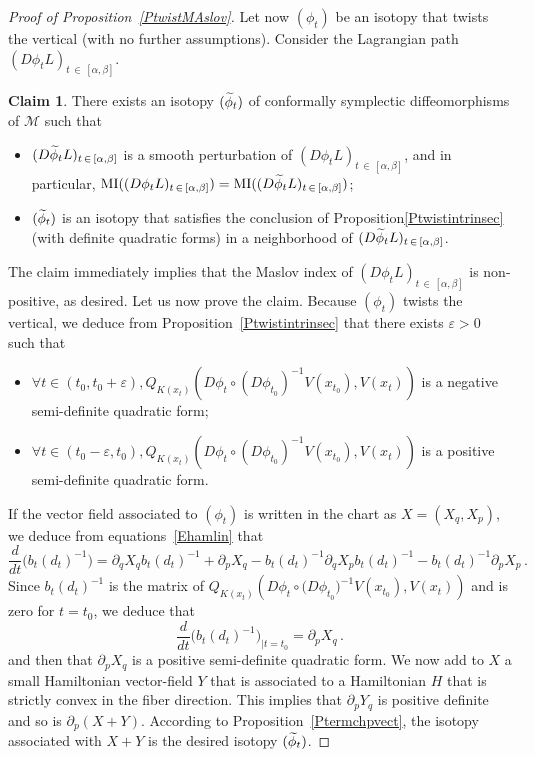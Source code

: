 \documentclass[10pt,a4paper]{amsart}
\numberwithin{equation}{section}
\newcommand*\M{\mathcal{M}}
\newcommand{\MI}{\mathrm{MI}}
\let\oldtilde\tilde
\renewcommand*{\tilde}[1]{\mathchoice{\widetilde{#1}}{\widetilde{#1}}{\oldtilde{#1}}{\oldtilde{#1}}}
\let\oldforall\forall
\renewcommand*{\forall}{\mathrel{\oldforall}}
\theoremstyle{definition}
\newtheorem{claim}[theo]{Claim}
\theoremstyle{remark}
\newenvironment{enonce}[1]{\begin{claim}}{\end{claim}}
\begin{document}
\begin{proof}[Proof of Proposition~\ref{PtwistMAslov}]
Let now $(\phi_t)$ be an isotopy that twists the vertical (with no further assumptions). Consider the Lagrangian path $(D\phi_tL)_{t\,\in\,[\alpha,\beta]}$.

\begin{enonce}{Claim}
There exists an isotopy $(\tilde\phi_t)$ of conformally symplectic diffeomorphisms of $\M$ such that
\begin{itemize}
\item $(D\tilde\phi_tL)_{t\,\in\,[\alpha,\beta]}$ is a smooth perturbation of $(D\phi_tL)_{t\,\in\,[\alpha,\beta]}$, and in particular, $\MI((D\phi_tL)_{t\,\in\,[\alpha,\beta]})=\MI((D\tilde\phi_tL)_{t\,\in\,[\alpha,\beta]})$;
\item $(\tilde\phi_t)$ is an isotopy {that satisfies the conclusion of Proposition\ref{Ptwistintrinsec} (with definite quadratic forms) in a neighborhood of $(D\tilde\phi_tL)_{t\,\in\,[\alpha,\beta]}$.}
\end{itemize}
\end{enonce}

The claim immediately implies that the Maslov index of $(D\phi_tL)_{t\,\in\,[\alpha,\beta]}$ is non-positive, as desired.\newline
Let us now prove the claim. Because $(\phi_t)$ twists the vertical, we deduce from Proposition~\ref{Ptwistintrinsec} that there exists $\varepsilon>0$ such that
\begin{itemize}
\item $\forall t\in (t_0, t_0+\varepsilon), Q_{K(x_t)}(D\phi_t\circ (D\phi_{t_0})^{-1}V(x_{t_0}), V(x_t)) $ is a negative semi-definite quadratic form;
\item $\forall t\in (t_0-\varepsilon, t_0), Q_{K(x_t)}(D\phi_t\circ (D\phi_{t_0})^{-1}V(x_{t_0}), V(x_t)) $ is a positive semi-definite quadratic form.
\end{itemize}
If the vector field associated to $(\phi_t)$ is written in the chart as $X=(X_q, X_p)$, we deduce from equations~\eqref{Ehamlin} that
\[
\frac{d}{dt}\big(b_t(d_t)^{-1}
\big)=\partial_qX_qb_t(d_t)^{-1}+\partial_pX_q-b_t(d_t)^{-1}\partial_qX_pb_t(d_t)^{-1}-b_t(d_t)^{-1}\partial_pX_p\,.
\]
Since $b_t(d_t)^{-1}$ is the matrix of $Q_{K(x_t)}(D\phi_t\circ \big(D\phi_{t_0}\big)^{-1}V(x_{t_0}), V(x_t))$ and is zero for $t=t_0$, we deduce that
\[
\frac{d}{dt}\big(b_t(d_t)^{-1}
\big)_{|t=t_0}= \partial_pX_q\,.
\]
and then that $\partial_pX_q$ is a positive semi-definite quadratic form. We now add to $X$ a small Hamiltonian vector-field $Y$ that is associated to a Hamiltonian $H$ that is strictly convex in the fiber direction. This implies that $\partial_pY_q$ is positive definite and so is $\partial_p(X+Y)$. {According to Proposition~\ref{Ptermchpvect},} the isotopy associated with $X+Y$ is the desired isotopy $(\tilde\phi_t)$.
\end{proof}
\end{document}
